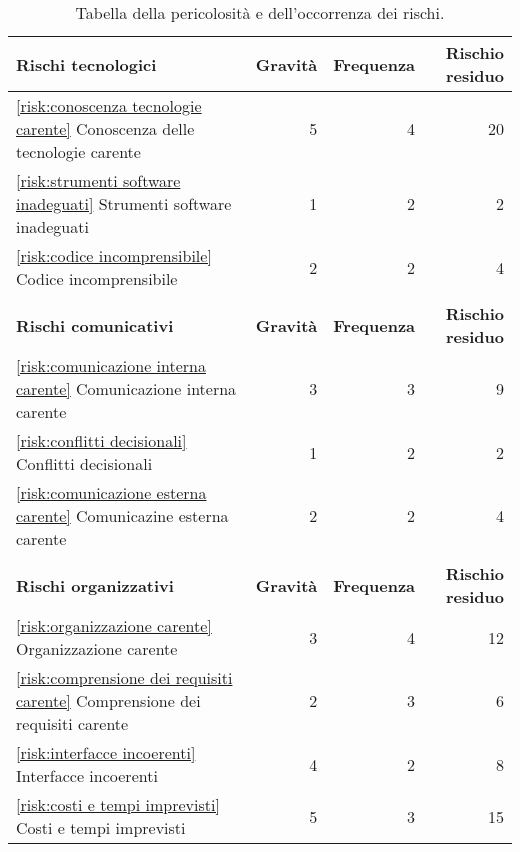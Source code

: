 \begin{table}[H]
	\centering

	\begin{tabular}{l|r|r|r}
		\hline
		\textbf{Rischi tecnologici}                                                          & \textbf{Gravità} & \textbf{Frequenza} & \textbf{Rischio residuo} \\
		\hline
		\autoref{risk:conoscenza tecnologie carente} Conoscenza delle tecnologie carente     & 5                & 4                  & 20                       \\
		\autoref{risk:strumenti software inadeguati} Strumenti software inadeguati           & 1                & 2                  & 2                        \\
		\autoref{risk:codice incomprensibile} Codice incomprensibile                         & 2                & 2                  & 4                        \\
		\hline
		\multicolumn{4}{l}{}                                                                                                                                    \\
		\hline
		\textbf{Rischi comunicativi}                                                         & \textbf{Gravità} & \textbf{Frequenza} & \textbf{Rischio residuo} \\
		\hline
		\autoref{risk:comunicazione interna carente} Comunicazione interna carente           & 3                & 3                  & 9                        \\
		\autoref{risk:conflitti decisionali} Conflitti decisionali                           & 1                & 2                  & 2                        \\
		\autoref{risk:comunicazione esterna carente} Comunicazine esterna carente            & 2                & 2                  & 4                        \\
		\hline
		\multicolumn{4}{l}{}                                                                                                                                    \\
		\hline
		\textbf{Rischi organizzativi}                                                        & \textbf{Gravità} & \textbf{Frequenza} & \textbf{Rischio residuo} \\
		\hline
		\autoref{risk:organizzazione carente} Organizzazione carente                         & 3                & 4                  & 12                       \\
		\autoref{risk:comprensione dei requisiti carente} Comprensione dei requisiti carente & 2                & 3                  & 6                        \\
		\autoref{risk:interfacce incoerenti} Interfacce incoerenti                           & 4                & 2                  & 8                        \\
		\autoref{risk:costi e tempi imprevisti} Costi e tempi imprevisti                     & 5                & 3                  & 15                       \\
		\hline
	\end{tabular}
	\caption{Tabella della pericolosità e dell'occorrenza dei rischi.}
\end{table}
